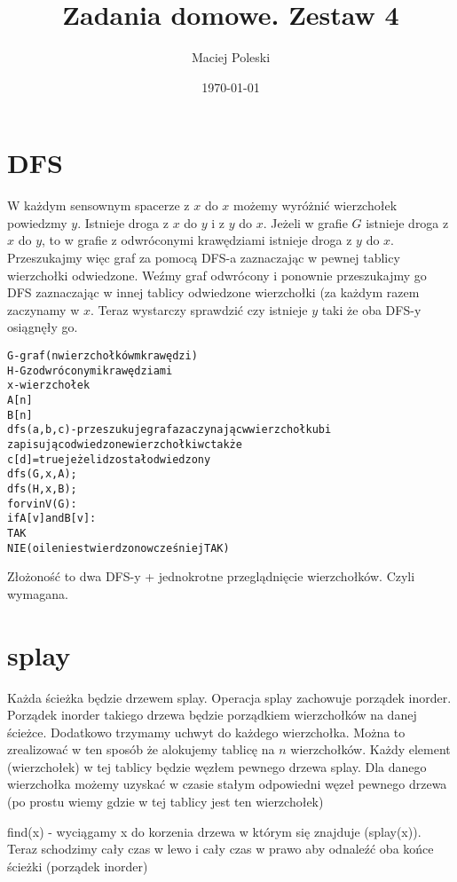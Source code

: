 \documentclass[a4paper,12pt]{article}
\title{Zadania domowe. Zestaw 4}
\author{Maciej Poleski}
\date{\today}
\begin{document}
\maketitle

\newpage

\section{DFS}
W każdym sensownym spacerze z $x$ do $x$ możemy wyróżnić wierzchołek powiedzmy $y$. Istnieje droga z $x$ do $y$ i z $y$ do $x$. Jeżeli w grafie $G$ istnieje droga z $x$ do $y$, to w grafie z odwróconymi krawędziami istnieje droga z $y$ do $x$. Przeszukajmy więc graf za pomocą DFS-a zaznaczając w pewnej tablicy wierzchołki odwiedzone. Weźmy graf odwrócony i ponownie przeszukajmy go DFS zaznaczając w innej tablicy odwiedzone wierzchołki (za każdym razem zaczynamy w $x$. Teraz wystarczy sprawdzić czy istnieje $y$ taki że oba DFS-y osiągnęły go.
\begin{alltt}
 G - graf (n wierzchołków m krawędzi)
 H - G z odwróconymi krawędziami
 x - wierzchołek
 A[n]
 B[n]
 dfs(a,b,c) - przeszukuje graf a zaczynając w wierzchołku b i 
                zapisując odwiedzone wierzchołki w c tak że 
                c[d] = true jeżeli d został odwiedzony
 dfs(G,x,A);
 dfs(H,x,B);
 for v in V(G):
    if A[v] and B[v]:
        TAK
 NIE (o ile nie stwierdzono wcześniej TAK)
\end{alltt}
Złożoność to dwa DFS-y + jednokrotne przeglądnięcie wierzchołków. Czyli wymagana.
\section{}
\section{splay}
Każda ścieżka będzie drzewem splay. Operacja splay zachowuje porządek inorder. Porządek inorder takiego drzewa będzie porządkiem wierzchołków na danej ścieżce. Dodatkowo trzymamy uchwyt do każdego wierzchołka. Można to zrealizować w ten sposób że alokujemy tablicę na $n$ wierzchołków. Każdy element (wierzchołek) w tej tablicy będzie węzłem pewnego drzewa splay. Dla danego wierzchołka możemy uzyskać w czasie stałym odpowiedni węzeł pewnego drzewa (po prostu wiemy gdzie w tej tablicy jest ten wierzchołek)

find(x) - wyciągamy x do korzenia drzewa w którym się znajduje (splay(x)). Teraz schodzimy cały czas w lewo i cały czas w prawo aby odnaleźć oba końce ścieżki (porządek inorder)
\end{document}
